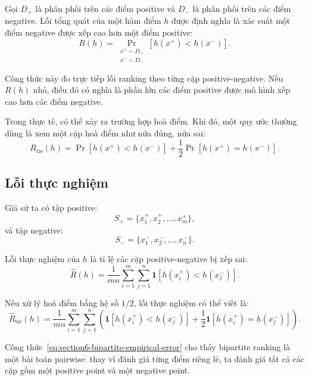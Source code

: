 Gọi \(D_{+}\) là phân phối trên các điểm positive và \(D_{-}\) là phân phối trên các điểm negative. Lỗi tổng quát của một hàm điểm \(h\) được định nghĩa là xác suất một điểm negative được xếp cao hơn một điểm positive:
\begin{equation}
    R(h)
    =
    \Pr_{\substack{x^{+}\sim D_{+}\\x^{-}\sim D_{-}}}
    \left[
        h(x^{+}) < h(x^{-})
    \right].
    \label{eq:section6-bipartite-generalization-error}
\end{equation}

Công thức này đo trực tiếp lỗi ranking theo từng cặp positive-negative. Nếu \(R(h)\) nhỏ, điều đó có nghĩa là phần lớn các điểm positive được mô hình xếp cao hơn các điểm negative.

Trong thực tế, có thể xảy ra trường hợp hoà điểm. Khi đó, một quy ước thường dùng là xem một cặp hoà điểm như nửa đúng, nửa sai:
\[
    R_{\mathrm{tie}}(h)
    =
    \Pr
    \left[
        h(x^{+}) < h(x^{-})
    \right]
    +
    \frac{1}{2}
    \Pr
    \left[
        h(x^{+}) = h(x^{-})
    \right].
\]

\subsection{Lỗi thực nghiệm}

Giả sử ta có tập positive:
\[
    S_{+}
    =
    \{x^{+}_{1},x^{+}_{2},\ldots,x^{+}_{m}\},
\]
và tập negative:
\[
    S_{-}
    =
    \{x^{-}_{1},x^{-}_{2},\ldots,x^{-}_{n}\}.
\]

Lỗi thực nghiệm của \(h\) là tỉ lệ các cặp positive-negative bị xếp sai:
\begin{equation}
    \widehat{R}(h)
    =
    \frac{1}{mn}
    \sum_{i=1}^{m}
    \sum_{j=1}^{n}
    \mathbf{1}
    \left[
        h(x^{+}_{i}) < h(x^{-}_{j})
    \right].
    \label{eq:section6-bipartite-empirical-error}
\end{equation}

Nếu xử lý hoà điểm bằng hệ số \(1/2\), lỗi thực nghiệm có thể viết là:
\[
    \widehat{R}_{\mathrm{tie}}(h)
    =
    \frac{1}{mn}
    \sum_{i=1}^{m}
    \sum_{j=1}^{n}
    \left(
        \mathbf{1}
        \left[
            h(x^{+}_{i}) < h(x^{-}_{j})
        \right]
        +
        \frac{1}{2}
        \mathbf{1}
        \left[
            h(x^{+}_{i}) = h(x^{-}_{j})
        \right]
    \right).
\]

Công thức~\eqref{eq:section6-bipartite-empirical-error} cho thấy bipartite ranking là một bài toán pairwise: thay vì đánh giá từng điểm riêng lẻ, ta đánh giá tất cả các cặp gồm một positive point và một negative point.

